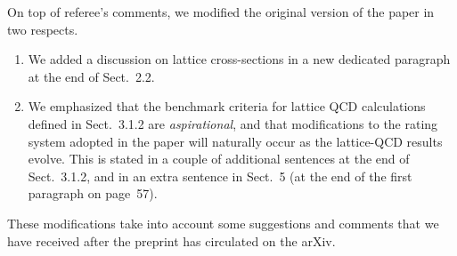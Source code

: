 \documentclass[11pt]{article}
\begin{document}
On top of referee's comments, we modified the original version
of the paper in two respects. 

\begin{enumerate}

\item We added a discussion on lattice cross-sections in a new dedicated
paragraph at the end of Sect.~2.2.

\item We emphasized that the benchmark criteria for lattice QCD 
calculations defined in Sect.~3.1.2 are {\it aspirational}, and that
modifications to the rating system adopted in the paper will naturally
occur as the lattice-QCD results evolve. This is stated in a couple of 
additional sentences at the end of Sect.~3.1.2, and in an extra sentence 
in Sect.~5 (at the end of the first paragraph on page~57).

\end{enumerate}

These modifications take into account some suggestions and comments that we
have received after the preprint has circulated on the arXiv.
\end{document}
